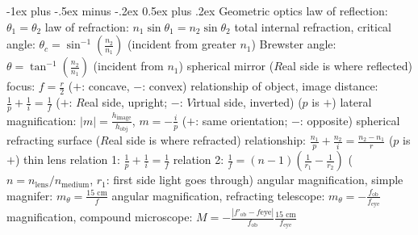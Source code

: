 \documentclass[10pt,landscape]{article}
\makeatletter
\renewcommand{\subsection}{\@startsection{subsection}{2}{0mm}%
                                {-1ex plus -.5ex minus -.2ex}%
                                {0.5ex plus .2ex}%
                                {\normalfont\normalsize\bfseries}}
\newcommand{\spc}{\hspace*{1em}}
\makeatother
\begin{document}
\begin{multicols*}{3}
\subsection{Geometric optics}
law of reflection: $\theta _1=\theta _2$
\newline
law of refraction: $n_1\sin \theta _1=n_2\sin \theta _2$
\newline
total internal refraction, critical angle: $\theta _c=\sin^{-1}(\frac{n_2}{n_1})$ 
\newline
\spc (incident from greater $n_1$)
\newline
Brewster angle: $\theta =\tan^{-1}(\frac{n_2}{n_1})$ (incident from $n_1$)
\newline \newline
spherical mirror ($R$eal side is where reflected)
\newline
\spc focus: $f=\frac{r}{2}$ ($+$: concave, $-$: convex)
\newline
\spc relationship of object, image distance: $\frac{1}{p}+\frac{1}{i}=\frac{1}{f}$ 
\newline
\spc \spc($+$: $R$eal side, upright; $-$: $V$irtual side, inverted) ($p$ is $+$)
\newline
\spc lateral magnification: $|m|=\frac{h_{\textrm{image}}}{h_{\textrm{obj}}}$, $m=-\frac{i}{p}$ 
\newline
\spc \spc($+$: same orientation; $-$: opposite)
\newline
spherical refracting surface ($R$eal side is where refracted)
\newline
\spc relationship: $\frac{n_1}{p}+\frac{n_2}{i}=\frac{n_2-n_1}{r}$ ($p$ is $+$)
\newline \newline
thin lens
\newline
\spc relation 1: $\frac{1}{p}+\frac{1}{i}=\frac{1}{f}$
\newline
\spc relation 2: $\frac{1}{f}=(n-1)(\frac{1}{r_1}-\frac{1}{r_2})$
\newline
\spc \spc ($n=n_{\textrm{lens}}/n_{\textrm{medium}}$, $r_1$: first side light goes through)
\newline \newline
angular magnification, simple magnifer: $m_\theta =\frac{15\textrm{ cm}}{f}$
\newline
angular magnification, refracting telescope: $m_\theta =-\frac{f_{\textrm{ob}}}{f_{\textrm{eye}}}$
\newline
magnification, compound microscope: $M=-\frac{|f'_{\textrm{ob}}-f{\textrm{eye}}|}{f_{\textrm{ob}}}\frac{15\textrm{ cm}}{f_{\textrm{eye}}}$ 


\end{multicols*}
\end{document}
